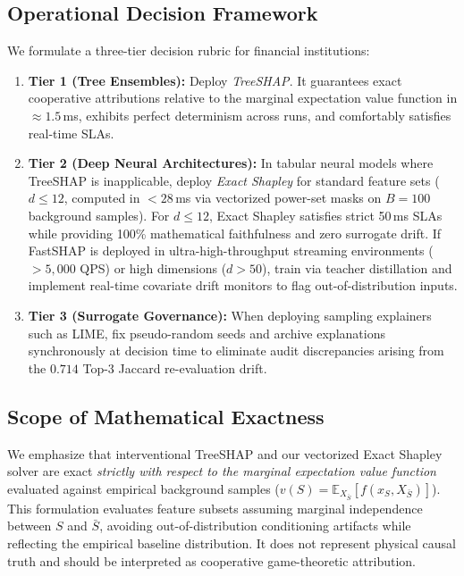 \documentclass[conference]{IEEEtran}
\begin{document}
\subsection{Operational Decision Framework}
We formulate a three-tier decision rubric for financial institutions:
\begin{enumerate}
    \item \textbf{Tier 1 (Tree Ensembles):} Deploy \textit{TreeSHAP}. It guarantees exact cooperative attributions relative to the marginal expectation value function in $\approx 1.5$\,ms, exhibits perfect determinism across runs, and comfortably satisfies real-time SLAs.
    \item \textbf{Tier 2 (Deep Neural Architectures):} In tabular neural models where TreeSHAP is inapplicable, deploy \textit{Exact Shapley} for standard feature sets ($d \le 12$, computed in $<28$\,ms via vectorized power-set masks on $B=100$ background samples). For $d \le 12$, Exact Shapley satisfies strict 50\,ms SLAs while providing 100\% mathematical faithfulness and zero surrogate drift. If FastSHAP is deployed in ultra-high-throughput streaming environments ($>5,000$ QPS) or high dimensions ($d > 50$), train via teacher distillation and implement real-time covariate drift monitors to flag out-of-distribution inputs.
    \item \textbf{Tier 3 (Surrogate Governance):} When deploying sampling explainers such as LIME, fix pseudo-random seeds and archive explanations synchronously at decision time to eliminate audit discrepancies arising from the $0.714$ Top-3 Jaccard re-evaluation drift.
\end{enumerate}

\subsection{Scope of Mathematical Exactness}
We emphasize that interventional TreeSHAP and our vectorized Exact Shapley solver are exact \textit{strictly with respect to the marginal expectation value function} evaluated against empirical background samples ($v(S) = \mathbb{E}_{X_{\bar{S}}}[f(x_S, X_{\bar{S}})]$). This formulation evaluates feature subsets assuming marginal independence between $S$ and $\bar{S}$, avoiding out-of-distribution conditioning artifacts while reflecting the empirical baseline distribution. It does not represent physical causal truth and should be interpreted as cooperative game-theoretic attribution.
\end{document}
